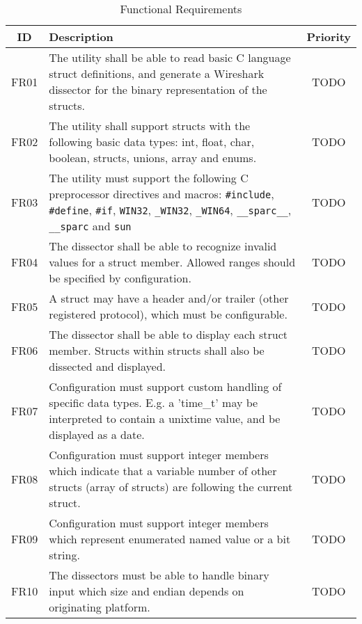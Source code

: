 \begin{table}[h] \center
\caption{Functional Requirements\label{tab:funcreq}}
\begin{tabular}{| c | p{9cm} | c |}
	\hline ID & Description & Priority \\
    \hline FR01 & The utility shall be able to read basic C language struct
		definitions, and generate a Wireshark dissector for the binary
		representation of the structs. & TODO \\
	\hline FR02 & The utility shall support structs with the following basic
		data types: int, float, char, boolean, structs, unions, array and
		enums. & TODO \\
	\hline FR03 & The utility must support the following C preprocessor
		directives and macros: \verb+#include+, \verb+#define+, \verb+#if+,
		\verb+WIN32+, \verb+_WIN32+, \verb+_WIN64+, \verb+__sparc__+,
		\verb+__sparc+ and \verb+sun+ & TODO \\
	\hline FR04 & The dissector shall be able to recognize invalid values for
		a struct member. Allowed ranges should be specified by configuration.
		& TODO \\
	\hline FR05 & A struct may have a header and/or trailer (other registered
		protocol), which must be configurable. & TODO \\
	\hline FR06 & The dissector shall be able to display each struct member.
		Structs within structs shall also be dissected and displayed. & TODO \\
	\hline FR07 & Configuration must support custom handling of
		specific data types. E.g. a 'time\_t' may be interpreted to contain a
		unixtime value, and be displayed as a date. & TODO \\
	\hline FR08 & Configuration must support integer members which indicate
		that a variable number of other structs (array of structs) are
		following the current struct. & TODO \\
	\hline FR09 & Configuration must support integer members which represent
		enumerated named value or a bit string. & TODO \\
	\hline FR10 & The dissectors must be able to handle binary input which size
		and endian depends on originating platform. & TODO \\
	\hline
\end{tabular}
\end{table}

